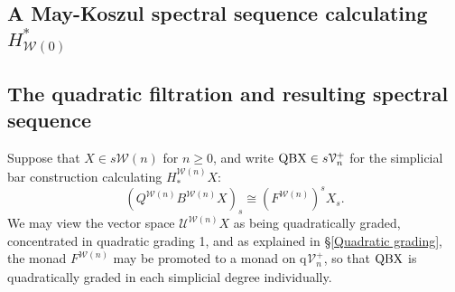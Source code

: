 \documentclass[11pt]{amsart} \renewcommand{\baselinestretch}{1.2}
\theoremstyle{plain}
\numberwithin{equation}{section} %
\theoremstyle{plain}
\numberwithin{equation}{chapter} %
\newcommand{\calW}{\mathcal{W}}
\newcommand{\calU}{\mathcal{U}}
\newcommand{\calV}{\mathcal{V}}
\newcommand{\calw}{\mathcal{W}}
\newcommand{\vect}[2]{\calV^{#1}_{#2}}
\newcommand{\quadgrad}[1]{\mathrm{q}_{#1}}
\newcommand{\SectionOrChapter}[1]{\section{\textbf{#1}}}
\newcommand{\SubsectionOrSection}[1]{\subsection{#1}}
\begin{document}
\begin{May sseq and vanishing line}
\SectionOrChapter{A May-Koszul spectral sequence calculating $H^*_{\calw(0)}$}
\label{May sseq and vanishing line}

\SubsectionOrSection{The quadratic filtration and resulting spectral sequence}
\label{The quadratic filtration section}
Suppose that $X\in s\calw(n)$ for  $n\geq0$, and write $\textup{QBX}\in s\vect{+}{n}$ for the simplicial bar construction   calculating $H_*^{\calw(n)}X$:
\[(Q^{\calw(n)}B^{\calw(n)}X)_s\cong (F^{\calw(n)})^{s}X_{s}.\] We may view the vector space $\calU^{\calw(n)}X$ as being quadratically graded, concentrated in quadratic grading 1, and as explained in \S\ref{Quadratic grading}, the monad $F^{\calW(n)}$ may be promoted to a monad on $\quadgrad{}\vect{+}{n}$, so that $\textup{QBX}$ is quadratically graded in each simplicial degree individually.


\end{May sseq and vanishing line}
\end{document}
